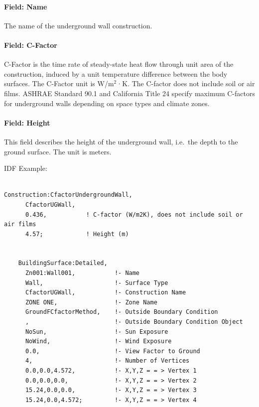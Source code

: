 \paragraph{Field: Name}\label{field-name-29-000}

The name of the underground wall construction.

\paragraph{Field: C-Factor}\label{field-c-factor}

C-Factor is the time rate of steady-state heat flow through unit area of the construction, induced by a unit temperature difference between the body surfaces. The C-Factor unit is W/m\(^{2}\)·K. The C-factor does not include soil or air films. ASHRAE Standard 90.1 and California Title 24 specify maximum C-factors for underground walls depending on space types and climate zones.

\paragraph{Field: Height}\label{field-height}

This field describes the height of the underground wall, i.e.~the depth to the ground surface. The unit is meters.

IDF Example:

\begin{lstlisting}

Construction:CfactorUndergroundWall,
      CfactorUGWall,
      0.436,           ! C-factor (W/m2K), does not include soil or air films
      4.57;            ! Height (m)


    BuildingSurface:Detailed,
      Zn001:Wall001,           !- Name
      Wall,                    !- Surface Type
      CfactorUGWall,           !- Construction Name
      ZONE ONE,                !- Zone Name
      GroundFCfactorMethod,    !- Outside Boundary Condition
      ,                        !- Outside Boundary Condition Object
      NoSun,                   !- Sun Exposure
      NoWind,                  !- Wind Exposure
      0.0,                     !- View Factor to Ground
      4,                       !- Number of Vertices
      0.0,0.0,4.572,           !- X,Y,Z = = > Vertex 1
      0.0,0.0,0.0,             !- X,Y,Z = = > Vertex 2
      15.24,0.0,0.0,           !- X,Y,Z = = > Vertex 3
      15.24,0.0,4.572;         !- X,Y,Z = = > Vertex 4
\end{lstlisting}

